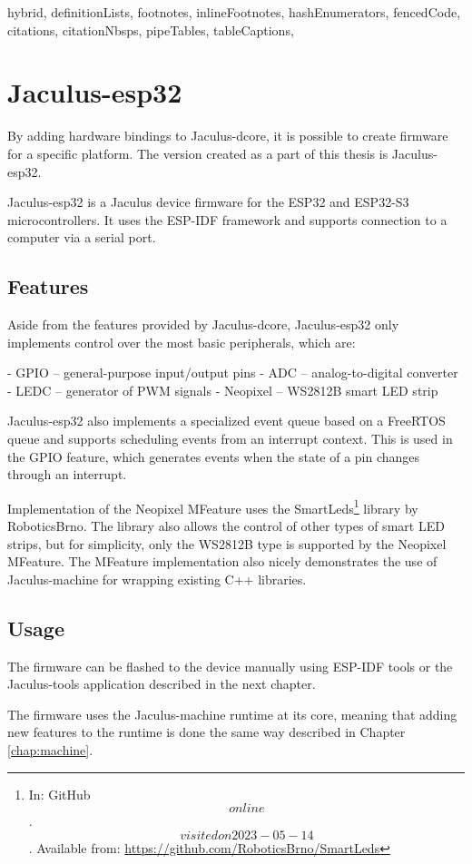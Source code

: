 \begin{markdown*}{%
  hybrid,
  definitionLists,
  footnotes,
  inlineFootnotes,
  hashEnumerators,
  fencedCode,
  citations,
  citationNbsps,
  pipeTables,
  tableCaptions,
}

\chapter{Jaculus-esp32}

By adding hardware bindings to Jaculus-dcore, it is possible to create firmware for a specific platform. The version created as a part of this thesis is Jaculus-esp32.

Jaculus-esp32 is a Jaculus device firmware for the ESP32 and ESP32-S3 microcontrollers. It uses the ESP-IDF framework and supports connection to a computer via a serial port.

\section{Features}

Aside from the features provided by Jaculus-dcore, Jaculus-esp32 only implements control over the most basic peripherals, which are:

  - GPIO -- general-purpose input/output pins
  - ADC -- analog-to-digital converter
  - LEDC -- generator of PWM signals
  - Neopixel -- WS2812B smart LED strip

Jaculus-esp32 also implements a specialized event queue based on a FreeRTOS queue and supports scheduling events from an interrupt context. This is used in the GPIO feature, which generates events when the state of a pin changes through an interrupt.

Implementation of the Neopixel MFeature uses the SmartLeds\footnote{In: GitHub \[online\]. \[visited on 2023-05-14\]. Available from: \url{https://github.com/RoboticsBrno/SmartLeds}} library by RoboticsBrno. The library also allows the control of other types of smart LED strips, but for simplicity, only the WS2812B type is supported by the Neopixel MFeature. The MFeature implementation also nicely demonstrates the use of Jaculus-machine for wrapping existing C++ libraries.

\section{Usage}

The firmware can be flashed to the device manually using ESP-IDF tools or the Jaculus-tools application described in the next chapter.

The firmware uses the Jaculus-machine runtime at its core, meaning that adding new features to the runtime is done the same way described in Chapter \ref{chap:machine}.

\end{markdown*}
